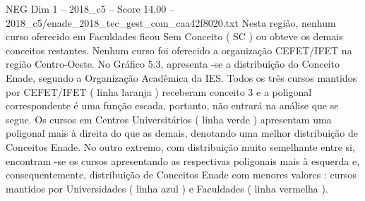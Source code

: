 \begin{textsample}{NEG Dim 1 – 2018\_c5 – Score 14.00 – 2018\_c5/enade\_2018\_tec\_gest\_com\_caa42f8020.txt}
Nesta região, nenhum curso oferecido em Faculdades ficou Sem Conceito ( SC ) ou obteve os demais conceitos restantes.
Nenhum curso foi oferecido a organização CEFET/IFET na região Centro-Oeste.
No Gráfico 5.3, apresenta -se a distribuição do Conceito Enade, segundo a Organização Acadêmica da IES.
Todos os três cursos mantidos por CEFET/IFET ( linha laranja ) receberam conceito 3 e a poligonal correspondente é uma função escada, portanto, não entrará na análise que se segue.
Os cursos em Centros Universitários ( linha verde ) apresentam uma poligonal mais à direita do que as demais, denotando uma melhor distribuição de Conceitos Enade.
No outro extremo, com distribuição muito semelhante entre si, encontram -se os cursos apresentando as respectivas poligonais mais à esquerda e, consequentemente, distribuição de Conceitos Enade com menores valores : cursos mantidos por Universidades ( linha azul ) e Faculdades ( linha vermelha ).

\end{textsample}
